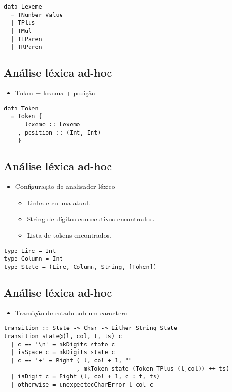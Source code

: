\documentclass[11pt]{article}
\begin{document}
\begin{verbatim}
data Lexeme  
  = TNumber Value  
  | TPlus 
  | TMul
  | TLParen
  | TRParen 
\end{verbatim}
\subsection*{Análise léxica ad-hoc}
\label{sec:org3fed344}

\begin{itemize}
\item Token = lexema + posição
\end{itemize}

\begin{verbatim}
data Token 
  = Token {
      lexeme :: Lexeme
    , position :: (Int, Int)
    } 
\end{verbatim}
\subsection*{Análise léxica ad-hoc}
\label{sec:orged9d1fd}

\begin{itemize}
\item Configuração do analisador léxico
\begin{itemize}
\item Linha e coluna atual.
\item String de dígitos consecutivos encontrados.
\item Lista de tokens encontrados.
\end{itemize}
\end{itemize}

\begin{verbatim}
type Line = Int 
type Column = Int
type State = (Line, Column, String, [Token])
\end{verbatim}
\subsection*{Análise léxica ad-hoc}
\label{sec:orgb195486}

\begin{itemize}
\item Transição de estado sob um caractere
\end{itemize}

\begin{verbatim}
transition :: State -> Char -> Either String State
transition state@(l, col, t, ts) c 
  | c == '\n' = mkDigits state c 
  | isSpace c = mkDigits state c 
  | c == '+' = Right ( l, col + 1, ""
                     , mkToken state (Token TPlus (l,col)) ++ ts)
  | isDigit c = Right (l, col + 1, c : t, ts)
  | otherwise = unexpectedCharError l col c 
\end{verbatim}
\end{document}
